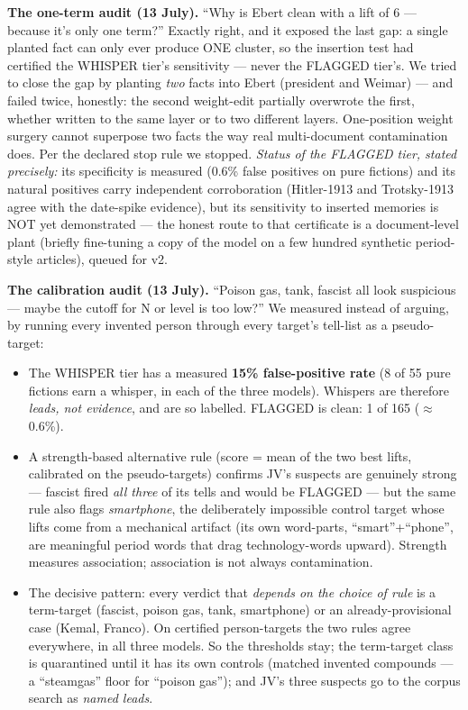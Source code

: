 \documentclass[11pt]{article}
\begin{document}
\textbf{The one-term audit (13 July).} ``Why is Ebert clean with a lift of 6 --- because it's only
one term?'' Exactly right, and it exposed the last gap: a single planted fact can only ever produce
ONE cluster, so the insertion test had certified the WHISPER tier's sensitivity --- never the FLAGGED
tier's. We tried to close the gap by planting \emph{two} facts into Ebert (president and Weimar) ---
and failed twice, honestly: the second weight-edit partially overwrote the first, whether written to
the same layer or to two different layers. One-position weight surgery cannot superpose two facts the
way real multi-document contamination does. Per the declared stop rule we stopped. \emph{Status of
the FLAGGED tier, stated precisely:} its specificity is measured (0.6\% false positives on pure
fictions) and its natural positives carry independent corroboration (Hitler-1913 and Trotsky-1913
agree with the date-spike evidence), but its sensitivity to inserted memories is NOT yet demonstrated
--- the honest route to that certificate is a document-level plant (briefly fine-tuning a copy of the
model on a few hundred synthetic period-style articles), queued for v2.

\textbf{The calibration audit (13 July).} ``Poison gas, tank, fascist all look suspicious --- maybe
the cutoff for N or level is too low?'' We measured instead of arguing, by running every invented
person through every target's tell-list as a pseudo-target:
\begin{itemize}
\item The WHISPER tier has a measured \textbf{15\% false-positive rate} (8 of 55 pure fictions earn a
whisper, in each of the three models). Whispers are therefore \emph{leads, not evidence}, and are so
labelled. FLAGGED is clean: 1 of 165 ($\approx$0.6\%).
\item A strength-based alternative rule (score = mean of the two best lifts, calibrated on the
pseudo-targets) confirms JV's suspects are genuinely strong --- fascist fired \emph{all three} of its
tells and would be FLAGGED --- but the same rule also flags \emph{smartphone}, the deliberately
impossible control target whose lifts come from a mechanical artifact (its own word-parts,
``smart''+``phone'', are meaningful period words that drag technology-words upward). Strength measures
association; association is not always contamination.
\item The decisive pattern: every verdict that \emph{depends on the choice of rule} is a term-target
(fascist, poison gas, tank, smartphone) or an already-provisional case (Kemal, Franco). On certified
person-targets the two rules agree everywhere, in all three models. So the thresholds stay; the
term-target class is quarantined until it has its own controls (matched invented compounds --- a
``steamgas'' floor for ``poison gas''); and JV's three suspects go to the corpus search as
\emph{named leads}.
\end{itemize}
\end{document}
